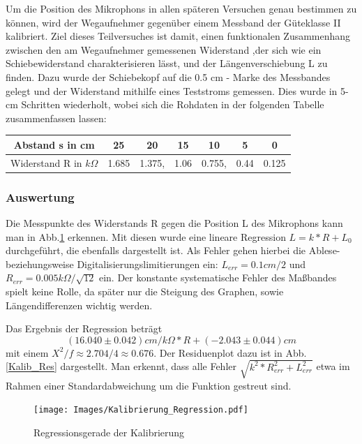 \documentclass[]{article}
\begin{document}
	Um die Position des Mikrophons in allen späteren Versuchen genau bestimmen zu können, wird der Wegaufnehmer gegenüber einem Messband der Güteklasse II kalibriert. Ziel dieses Teilversuches ist damit, einen funktionalen Zusammenhang zwischen den am Wegaufnehmer gemessenen Widerstand ,der sich wie ein Schiebewiderstand charakterisieren lässt, und der Längenverschiebung L zu finden. Dazu wurde der Schiebekopf auf die 0.5 cm - Marke des Messbandes gelegt und der Widerstand mithilfe eines Teststroms gemessen. Dies wurde in 5-cm Schritten wiederholt, wobei sich die Rohdaten in der folgenden Tabelle zusammenfassen lassen:

	\begin{center}
	\begin{tabular}{|c|c|c|c|c|c|c|}
		\hline 
		Abstand s in cm & 25 & 20 & 15 & 10 & 5 & 0 \\ 
		\hline 
		Widerstand R in $k\Omega$ & 1.685 & 1.375, & 1.06 & 0.755, & 0.44 & 0.125 \\ 
		\hline 
	\end{tabular} 
	\end{center}

	\subsubsection{Auswertung}

	Die Messpunkte des Widerstands R gegen die Position L des Mikrophons kann man in Abb.\ref{Kalib_Reg} erkennen. Mit diesen wurde eine lineare Regression $L=k*R+L_0$ durchgeführt, die ebenfalls dargestellt ist. Als Fehler gehen hierbei die Ablese- beziehungsweise Digitalisierungslimitierungen ein: $L_{err}=0.1cm/2$ und $R_{err}=0.005k\Omega/\sqrt{12}$ ein. Der konstante systematische Fehler des Maßbandes spielt keine Rolle, da später nur die Steigung des Graphen, sowie Längendifferenzen wichtig werden.      

	Das Ergebnis der Regression beträgt 
	\begin{equation}
		(16.040\pm0.042)cm/k\Omega*R+(-2.043\pm0.044)cm
		\label{Kalib}
	\end{equation}
	mit einem $X^2/f \approx 2.704/4 \approx 0.676$. Der Residuenplot dazu ist in Abb.\ref{Kalib_Res} dargestellt. Man erkennt, dass alle Fehler $\sqrt{k^2*R_{err}^2+L_{err}^2}$ etwa im Rahmen einer Standardabweichung um die Funktion gestreut sind.\\   

	\begin{figure}
	\begin{center}
		\texttt{[image: Images/Kalibrierung\_Regression.pdf]}
		\caption{Regressionsgerade der Kalibrierung}             
		\label{Kalib_Reg}               
	\end{center}            
	\end{figure} 
\end{document}
